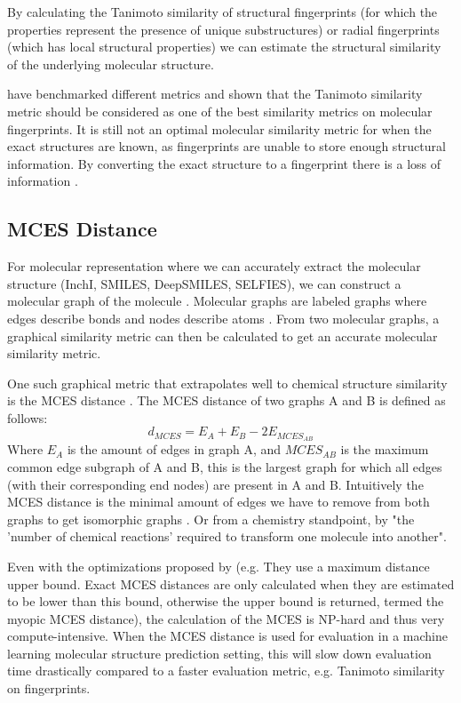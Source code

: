 By calculating the Tanimoto similarity of structural fingerprints (for which the properties represent the presence of unique substructures) or radial fingerprints (which has local structural properties) we can estimate the structural similarity of the underlying molecular structure.

\textcite{bajusz2015tanimoto} have benchmarked different metrics and shown that the Tanimoto similarity metric should be considered as one of the best similarity metrics on molecular fingerprints. It is still not an optimal molecular similarity metric for when the exact structures are known, as fingerprints are unable to store enough structural information. By converting the exact structure to a fingerprint there is a loss of information \cite{kretschmer2023small}.

\subsection{MCES Distance}
For molecular representation where we can accurately extract the molecular structure (InchI, SMILES, DeepSMILES, SELFIES), we can construct a molecular graph of the molecule \cite{wigh2022review}. Molecular graphs are labeled graphs where edges describe bonds and nodes describe atoms \cite{kretschmer2023small}. From two molecular graphs, a graphical similarity metric can then be calculated to get an accurate molecular similarity metric. 

One such graphical metric that extrapolates well to chemical structure similarity is the \ac{MCES} distance \cite{kretschmer2023small}. The MCES distance of two graphs A and B is defined as follows:
\[d_{MCES} = E_A + E_B - 2E_{MCES_{AB}}\]
Where $E_A$ is the amount of edges in graph A, and $MCES_{AB}$ is the maximum common edge subgraph of A and B, this is the largest graph for which all edges (with their corresponding end nodes) are present in A and B. Intuitively the MCES distance is the minimal amount of edges we have to remove from both graphs to get isomorphic graphs \cite{kretschmer2023small}. Or from a chemistry standpoint, by \textcite{kretschmer2023small} "the 'number of chemical reactions' required to transform one molecule into another".

Even with the optimizations proposed by \textcite{kretschmer2023small}
(e.g. They use a maximum distance upper bound.
Exact MCES distances are only calculated when they are estimated to be lower than this bound,
otherwise the upper bound is returned, termed the myopic MCES distance),
the calculation of the MCES is NP-hard and thus very compute-intensive.
When the MCES distance is used for evaluation in a machine learning molecular structure prediction setting,
this will slow down evaluation time drastically compared to a faster evaluation metric, e.g. Tanimoto similarity on fingerprints.

